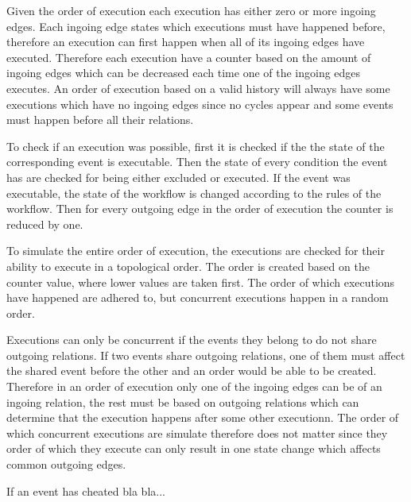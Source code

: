    Given the order of execution each execution has either zero or more ingoing edges. Each ingoing edge states which executions must have happened before, therefore an execution can first happen when all of its ingoing edges have executed. Therefore each execution have a counter based on the amount of ingoing edges which can be decreased each time one of the ingoing edges executes. An order of execution based on a valid history will always have some executions which have no ingoing edges since no cycles appear and some events must happen before all their relations. 
    
    \newpar To check if an execution was possible, first it is checked if the the state of the corresponding event is executable. Then the state of every condition the event has are checked for being either excluded or executed. If the event was executable, the state of the workflow is changed according to the rules of the workflow. Then for every outgoing edge in the order of execution the counter is reduced by one. 
    
    \newpar To simulate the entire order of execution, the executions are checked for their ability to execute in a topological order. The order is created based on the counter value, where lower values are taken first. The order of which executions have happened are adhered to, but concurrent executions happen in a random order.
    
    Executions can only be concurrent if the events they belong to do not share outgoing relations. If two events share outgoing relations, one of them must affect the shared event before the other and an order would be able to be created. Therefore in an order of execution only one of the ingoing edges can be of an ingoing relation, the rest must be based on outgoing relations which can determine that the execution happens after some other executionn. The order of which concurrent executions are simulate therefore does not matter since they order of which they execute can only result in one state change which affects common outgoing edges.

    If an event has cheated bla bla...
    
